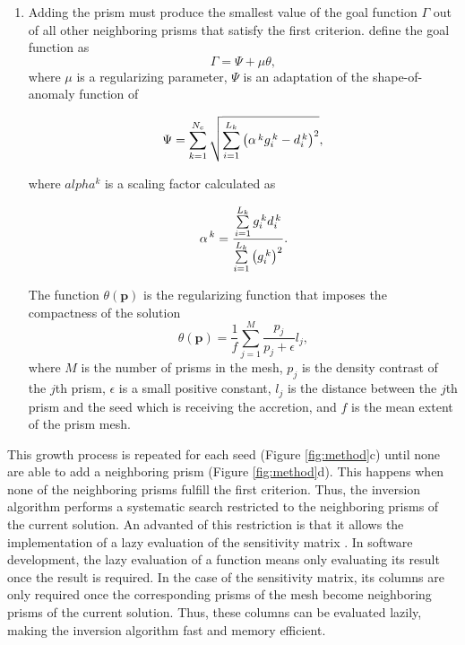 \documentclass[twocolumn,final]{svjour3}
\newcommand{\vect}[1]{\mathbf{#1}}
\begin{document}
\begin{sloppypar}
\begin{enumerate}
    \item Adding the prism must produce
    the smallest value of the goal function $\Gamma$
    out of all other neighboring prisms
    that satisfy the first criterion.
    \citet{uieda_shape} define the goal function as
    \begin{equation}
        \Gamma = \Psi + \mu\theta,
        \label{eq:goal}
    \end{equation}
    where $\mu$ is a regularizing parameter,
    $\Psi$ is an adaptation of the shape-of-anomaly function of \citet{rene}
    \citep{uieda_planting}

    \begin{equation}
        \Psi = \sum\limits_{k=1}^{N_{c}} {
        \sqrt{
            \sum\limits_{i=1}^{L_k}
            \left(
                \alpha^{\thinspace k} g_{i}^{\thinspace k} -
                d_{i}^{\thinspace k}
            \right)^{2}
        }},
        \label{eq:shapek}
    \end{equation}

    where $alpha^k$ is a scaling factor calculated as

    \begin{equation}
        \alpha^{\thinspace k} = \dfrac{
            \sum\limits_{i=1}^{L_k} g_{i}^{\thinspace k} d_{i}^{\thinspace k}
        }{
            \sum\limits_{i=1}^{L_k}\left( g_{i}^{\thinspace k}\right)^{2}
        }.
        \label{eq:alpha}
    \end{equation}

    The function $\theta(\vect{p})$
    is the regularizing function
    that imposes the compactness of the solution
    \citep{uieda_planting}
    \begin{equation}
        \theta(\vect{p}) = \frac{1}{f} \sum\limits_{j=1}^{M}
        \dfrac{p_j}{p_j + \epsilon} l_{j},
        \label{eq:regul}
    \end{equation}
    where $M$ is the number of prisms in the mesh,
    $p_{j}$ is the density contrast of the $j$th prism,
    $\epsilon$ is a small positive constant,
    $l_{j}$ is the distance between the $j$th prism
    and the seed which is receiving the accretion,
    and $f$ is the mean extent of the prism mesh.
\end{enumerate}

This growth process
is repeated for each seed (Figure \ref{fig:method}c)
until none are able
to add a neighboring prism (Figure \ref{fig:method}d).
This happens when
none of the neighboring prisms
fulfill the first criterion.
Thus,
the inversion algorithm
performs a systematic search
restricted to the neighboring
prisms of the current solution.
An advanted of this restriction
is that it allows
the implementation of a lazy evaluation
of the sensitivity matrix
\citep{uieda_planting}.
In software development,
the lazy evaluation of a function
means only evaluating its result
once the result is required.
In the case of the sensitivity matrix,
its columns are only required
once the corresponding prisms of the mesh
become neighboring prisms
of the current solution.
Thus, these columns can be evaluated lazily,
making the inversion algorithm
fast and memory efficient.
\end{sloppypar}
\end{document}
